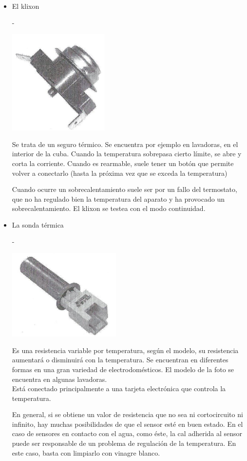 \documentclass[a5paper,twoside,openany]{book}
\newenvironment{normalize}{\leftskip-\leftmargin}{\par}
\begin{document}
\begin{itemize}
\item El klixon

\begin{normalize}
\begin{minipage}[h]{\textwidth}\vspace{0pt}
\includegraphics[width=0.3\linewidth]{klixon}
\centering
\end{minipage}

Se trata de un seguro térmico. 
Se encuentra por ejemplo en lavadoras, en el interior de la cuba.
Cuando la temperatura sobrepasa cierto límite, se abre y corta la corriente.
Cuando es rearmable, suele tener un botón que permite volver a conectarlo (hasta la próxima vez que se exceda la temperatura)

Cuando ocurre un sobrecalentamiento suele ser por un fallo del termostato, que no ha regulado bien la temperatura del aparato y ha provocado un sobrecalentamiento.
El klixon se testea con el modo continuidad.
\end{normalize}

\item La sonda térmica

\begin{normalize}
\begin{minipage}[h]{\textwidth}\vspace{0pt}
\includegraphics[width=0.3\linewidth]{sonda-termica}
\centering
\end{minipage}

Es una resistencia variable por temperatura, según el modelo, su resistencia aumentará o disminuirá con la temperatura.
Se encuentran en diferentes formas en una gran variedad de electrodomésticos.
El modelo de la foto se encuentra en algunas lavadoras.
\\

Está conectado principalmente a una tarjeta electrónica que controla la
temperatura.

En general, si se obtiene un valor de resistencia que no sea ni cortocircuito ni infinito, hay muchas posibilidades de que el sensor esté en buen estado.
En el caso de sensores en contacto con el agua, como éste, la cal adherida al sensor 
puede ser responsable de un problema de regulación de la temperatura.
En este caso, basta con limpiarlo con vinagre blanco.
\end{normalize}

\end{itemize}
\end{document}
